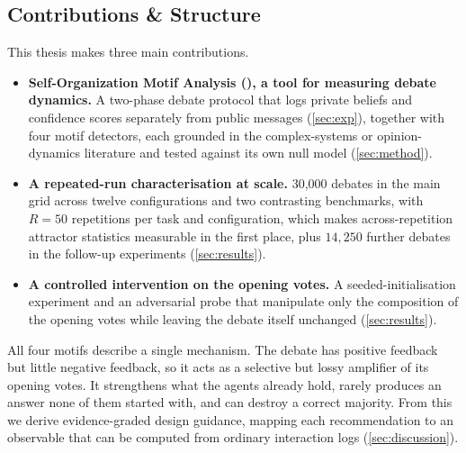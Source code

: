 \subsection{Contributions \& Structure}
\label{sec:intro:contributions}

This thesis makes three main contributions.

\begin{itemize}
  \item \textbf{Self-Organization Motif Analysis (\suitename{}), a tool for measuring debate dynamics.}
        A two-phase debate protocol that logs private beliefs and confidence scores
        separately from public messages (\autoref{sec:exp}), together with four
        motif detectors, each grounded in the complex-systems or
        opinion-dynamics literature and tested against its own null model
        (\autoref{sec:method}).

  \item \textbf{A repeated-run characterisation at scale.} 30{,}000 debates in the main grid
        across twelve configurations and two contrasting
        benchmarks, with $R = 50$ repetitions per task and configuration, which
        makes across-repetition attractor statistics measurable in the first
        place, plus $14{,}250$ further debates in the follow-up experiments
        (\autoref{sec:results}).

  \item \textbf{A controlled intervention on the opening votes.} A
        seeded-initialisation experiment and an adversarial probe that
        manipulate only the composition of the opening votes while leaving the
        debate itself unchanged (\autoref{sec:results}).
\end{itemize}

\noindent All four motifs describe a single mechanism. The debate has positive
feedback but little negative feedback, so it acts as a selective but lossy amplifier
of its opening votes. It strengthens what the agents already
hold, rarely produces an answer none of them started with, and can destroy a
correct majority. From this we derive evidence-graded design guidance, mapping
each recommendation to an observable that can be computed from ordinary
interaction logs (\autoref{sec:discussion}).

